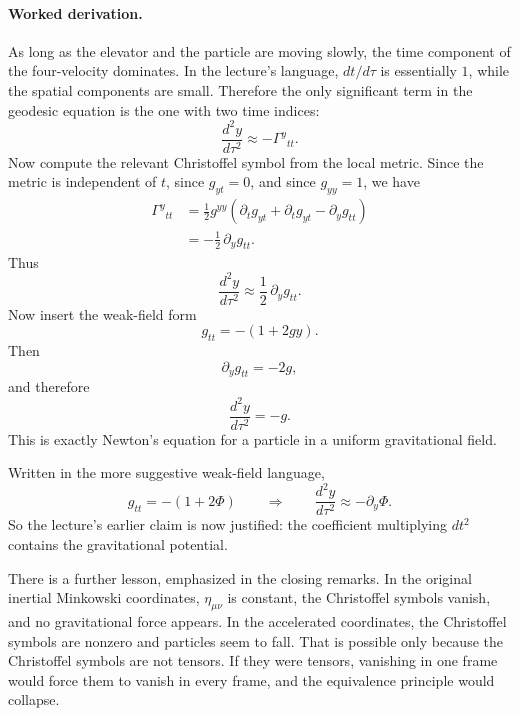 \paragraph{Worked derivation.}
As long as the elevator and the particle are moving slowly, the time component of the four-velocity dominates. In the lecture's language, \(dt/d\tau\) is essentially \(1\), while the spatial components are small. Therefore the only significant term in the geodesic equation is the one with two time indices:
\begin{equation}
\frac{d^2y}{d\tau^2}\approx -\Gamma^{y}{}_{tt}.
\end{equation}
Now compute the relevant Christoffel symbol from the local metric. Since the metric is independent of \(t\), since \(g_{yt}=0\), and since \(g_{yy}=1\), we have
\begin{align}
\Gamma^{y}{}_{tt}
&=
\frac{1}{2}g^{yy}
\left(
\partial_t g_{yt}
+
\partial_t g_{yt}
-
\partial_y g_{tt}
\right) \\
&=
-\frac{1}{2}\,\partial_y g_{tt}.
\end{align}
Thus
\begin{equation}
\frac{d^2y}{d\tau^2}
\approx
\frac{1}{2}\,\partial_y g_{tt}.
\end{equation}
Now insert the weak-field form
\begin{equation}
g_{tt}=-(1+2gy).
\end{equation}
Then
\begin{equation}
\partial_y g_{tt}=-2g,
\end{equation}
and therefore
\begin{equation}
\frac{d^2y}{d\tau^2}=-g.
\end{equation}
This is exactly Newton's equation for a particle in a uniform gravitational field.

Written in the more suggestive weak-field language,
\begin{equation}
g_{tt}=-(1+2\Phi)
\qquad \Longrightarrow \qquad
\frac{d^2y}{d\tau^2}\approx -\partial_y\Phi.
\end{equation}
So the lecture's earlier claim is now justified: the coefficient multiplying \(dt^2\) contains the gravitational potential.

There is a further lesson, emphasized in the closing remarks. In the original inertial Minkowski coordinates, \(\eta_{\mu\nu}\) is constant, the Christoffel symbols vanish, and no gravitational force appears. In the accelerated coordinates, the Christoffel symbols are nonzero and particles seem to fall. That is possible only because the Christoffel symbols are not tensors. If they were tensors, vanishing in one frame would force them to vanish in every frame, and the equivalence principle would collapse.

